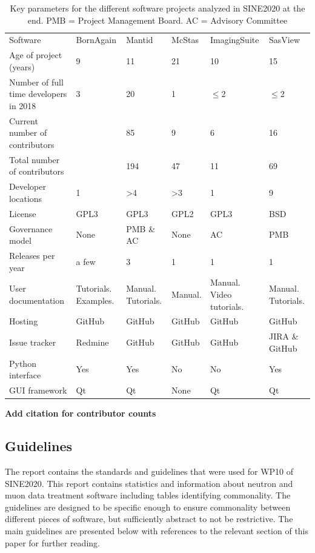 \documentclass[jnr]{iosart2x}
\newcommand{\todo}[1]{\textbf{#1}}
\begin{document}
\begin{table}
 \begin{tabular}{llllll}
   Software                               & BornAgain \cite{bornagain} & Mantid \cite{mantid} & McStas \cite{mcstas} & ImagingSuite \cite{ImagingSuite} & SasView \cite{sasview} \\
   Age of project (years)                 & 9 & 11 & 21 & 10 & 15 \\
   Number of full time developers in 2018 & 3 & 20 & 1 & $\le$2 & $\le$2 \\
   Current number of contributors         & & 85  & 9 & 6 & 16 \\
   Total number of contributors           & & 194 & 47 & 11 & 69 \\
   Developer locations                    & 1 & >4 & >3 & 1 & 9 \\
   License                                & GPL3 & GPL3 & GPL2 & GPL3 & BSD \\
   Governance model                       & None & PMB \& AC & None & AC & PMB \\
   Releases per year                      & a few & 3 & 1 & 1 & 1 \\
   User documentation                     & Tutorials. Examples. & Manual. Tutorials. & Manual. & Manual. Video tutorials. & Manual. Tutorials. \\
   Hosting                                & GitHub & GitHub & GitHub & GitHub & GitHub \\
   Issue tracker                          & Redmine & GitHub & GitHub & GitHub & JIRA \& GitHub \\
   Python interface                       & Yes & Yes & No & No & Yes \\
   GUI framework                          & Qt & Qt & None & Qt & Qt \\
 \end{tabular}
 \caption{Key parameters for the different software projects analyzed in SINE2020 at the end. PMB = Project Management Board. AC = Advisory Committee}
\label{summaryTable}
\end{table}

\todo{Add citation for contributor counts}

\subsection{Guidelines}

The report \cite{sine2020_wp10_d10_report} contains the standards and guidelines that were used for WP10 of SINE2020.
This report contains statistics and information about neutron and muon data treatment software including tables identifying commonality.
The guidelines are designed to be specific enough to ensure commonality between different pieces of software, but sufficiently abstract to not be restrictive.
The main guidelines are presented below with references to the relevant section of this paper for further reading.
\end{document}
